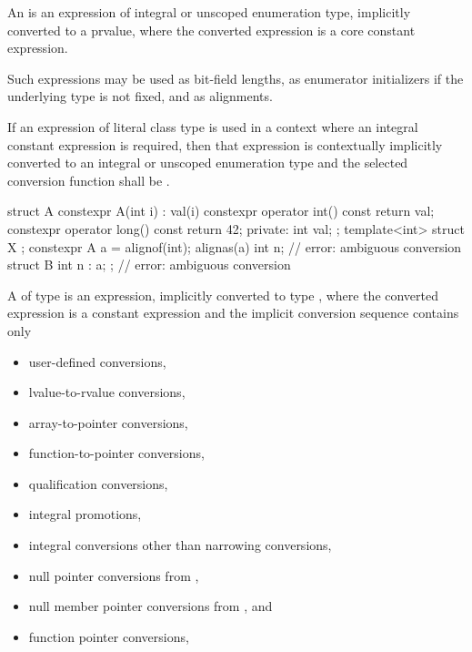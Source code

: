 \pnum
An 
is an expression of integral or
unscoped enumeration type, implicitly converted to a prvalue, where the converted expression is a core constant expression.
\begin{note}
Such expressions may be
used as bit-field lengths, as enumerator
initializers if the underlying type is not fixed,
and as alignments.
\end{note}

\pnum
If an expression of literal class type is used in a context where an
integral constant expression is required, then that expression is
contextually implicitly converted to an integral or unscoped
enumeration type
and the selected conversion function shall be . \begin{example}
\begin{codeblock}
struct A {
  constexpr A(int i) : val(i) { }
  constexpr operator int() const { return val; }
  constexpr operator long() const { return 42; }
private:
  int val;
};
template<int> struct X { };
constexpr A a = alignof(int);
alignas(a) int n;              // error: ambiguous conversion
struct B { int n : a; };       // error: ambiguous conversion
\end{codeblock}
\end{example}

\pnum
A 
of type  is an
expression, implicitly converted to type , where
the converted expression is a constant expression and the
implicit conversion sequence contains only

\begin{itemize}
\item user-defined conversions,
\item lvalue-to-rvalue conversions,
\item array-to-pointer conversions,
\item function-to-pointer conversions,
\item qualification conversions,
\item integral promotions,
\item integral conversions other than narrowing conversions,
\item null pointer conversions from ,
\item null member pointer conversions from , and
\item function pointer conversions,
\end{itemize}

